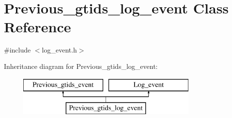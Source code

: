 \hypertarget{classPrevious__gtids__log__event}{}\section{Previous\+\_\+gtids\+\_\+log\+\_\+event Class Reference}
\label{classPrevious__gtids__log__event}


{\ttfamily \#include $<$log\+\_\+event.\+h$>$}

Inheritance diagram for Previous\+\_\+gtids\+\_\+log\+\_\+event\+:\begin{figure}[H]
\begin{center}
\leavevmode
\includegraphics[height=2.000000cm]{classPrevious__gtids__log__event}
\end{center}
\end{figure}
